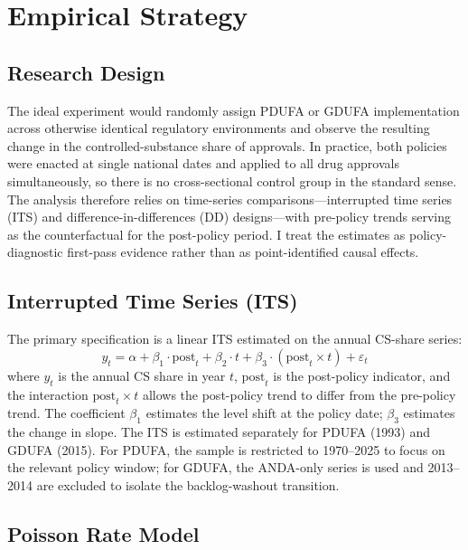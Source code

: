 \section{Empirical Strategy}
\label{sec:strategy}

\subsection{Research Design}

The ideal experiment would randomly assign PDUFA or GDUFA implementation across otherwise identical regulatory environments and observe the resulting change in the controlled-substance share of approvals. In practice, both policies were enacted at single national dates and applied to all drug approvals simultaneously, so there is no cross-sectional control group in the standard sense. The analysis therefore relies on time-series comparisons---interrupted time series (ITS) and difference-in-differences (DD) designs---with pre-policy trends serving as the counterfactual for the post-policy period. I treat the estimates as policy-diagnostic first-pass evidence rather than as point-identified causal effects.

\subsection{Interrupted Time Series (ITS)}

The primary specification is a linear ITS estimated on the annual CS-share series:
\begin{equation}
\label{eq:its}
y_t = \alpha + \beta_1 \cdot \text{post}_t + \beta_2 \cdot t + \beta_3 \cdot (\text{post}_t \times t) + \varepsilon_t
\end{equation}
where $y_t$ is the annual CS share in year $t$, $\text{post}_t$ is the post-policy indicator, and the interaction $\text{post}_t \times t$ allows the post-policy trend to differ from the pre-policy trend. The coefficient $\beta_1$ estimates the level shift at the policy date; $\beta_3$ estimates the change in slope. The ITS is estimated separately for PDUFA (1993) and GDUFA (2015). For PDUFA, the sample is restricted to 1970--2025 to focus on the relevant policy window; for GDUFA, the ANDA-only series is used and 2013--2014 are excluded to isolate the backlog-washout transition.

\subsection{Poisson Rate Model}

